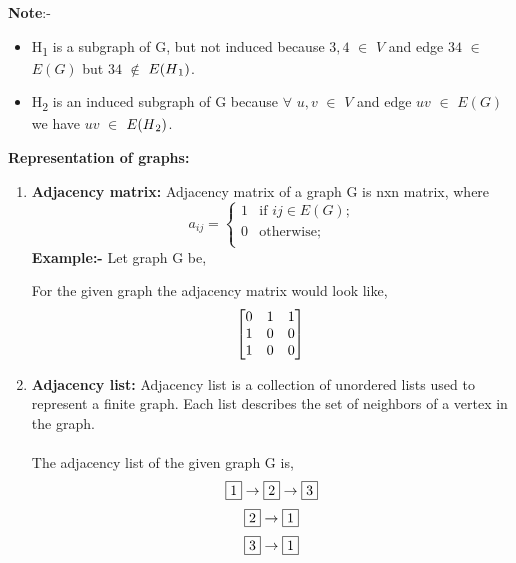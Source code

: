 \documentclass{article}
\begin{document}
\textbf{Note}:- 
\begin{itemize}
\item H\textsubscript{1} is a subgraph of G, but not induced because $3,4$ $\in$ $V$ and edge $34$ 
$\in$ $E(G)$ but $34$ $\notin$ $E(H\textsubscript{1})$.
\item H\textsubscript{2} is an induced subgraph of G because $\forall$ $u,v$ $\in$ $V$ and edge $uv$ 
$\in$ $E(G)$ we have $uv$ $\in$ $E(H\textsubscript{2})$.
\end{itemize}

\textbf{Representation of graphs:}
\begin{enumerate}
\item \textbf{Adjacency matrix: } Adjacency matrix of a graph G is nxn matrix, where
\[ a_{ij} = \left\{ \begin{array}{ll}

	1 & \mbox{if $ij \in E(G)$;} \\
   0 & \mbox{otherwise;} \\
	\end{array}
	\right. \]
\textbf{Example:-} Let graph G be,
\begin{center}
\end{center}
For the given graph the adjacency matrix would look like,
$$
\begin{bmatrix}
0 & 1 & 1 \\
1 & 0 & 0 \\
1 & 0 & 0
\end{bmatrix}\\
$$
\item \textbf{Adjacency list: } Adjacency list is a collection of unordered lists 
used to represent a finite graph. Each list describes the set of neighbors of 
a vertex in the graph.\\~\\
The adjacency list of the given graph G is,\\
$$\fbox{1}\rightarrow\fbox{2}\rightarrow\fbox{3}$$
$$\fbox{2}\rightarrow\fbox{1}$$
$$\fbox{3}\rightarrow\fbox{1}$$
\end{enumerate}
\end{document}
